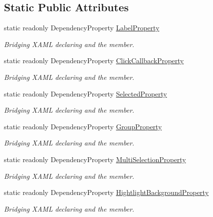 \subsection*{Static Public Attributes}
\begin{DoxyCompactItemize}
\item 
static readonly Dependency\+Property \mbox{\hyperlink{class_wpf_handler_1_1_u_i_1_1_controls_1_1_selectable_flat_button_afecdba1a6a477d574f423cc47ded74f7}{Label\+Property}}
\begin{DoxyCompactList}\small\item\em Bridging X\+A\+ML declaring and the member. \end{DoxyCompactList}\item 
static readonly Dependency\+Property \mbox{\hyperlink{class_wpf_handler_1_1_u_i_1_1_controls_1_1_selectable_flat_button_aebfe33b92f950fe559a1f33670ffe1b6}{Click\+Callback\+Property}}
\begin{DoxyCompactList}\small\item\em Bridging X\+A\+ML declaring and the member. \end{DoxyCompactList}\item 
static readonly Dependency\+Property \mbox{\hyperlink{class_wpf_handler_1_1_u_i_1_1_controls_1_1_selectable_flat_button_a8fcdfa5d44a6463e1c0296250fa260c9}{Selected\+Property}}
\begin{DoxyCompactList}\small\item\em Bridging X\+A\+ML declaring and the member. \end{DoxyCompactList}\item 
static readonly Dependency\+Property \mbox{\hyperlink{class_wpf_handler_1_1_u_i_1_1_controls_1_1_selectable_flat_button_a7263ef5d414587ec40f35ab3616173e4}{Group\+Property}}
\begin{DoxyCompactList}\small\item\em Bridging X\+A\+ML declaring and the member. \end{DoxyCompactList}\item 
static readonly Dependency\+Property \mbox{\hyperlink{class_wpf_handler_1_1_u_i_1_1_controls_1_1_selectable_flat_button_a5765829144f2d6ff2f76b972940ec242}{Multi\+Selection\+Property}}
\begin{DoxyCompactList}\small\item\em Bridging X\+A\+ML declaring and the member. \end{DoxyCompactList}\item 
static readonly Dependency\+Property \mbox{\hyperlink{class_wpf_handler_1_1_u_i_1_1_controls_1_1_selectable_flat_button_afc8f06c4a5fab3f5d259a250910ace6e}{Hightlight\+Background\+Property}}
\begin{DoxyCompactList}\small\item\em Bridging X\+A\+ML declaring and the member. \end{DoxyCompactList}\end{DoxyCompactItemize}
